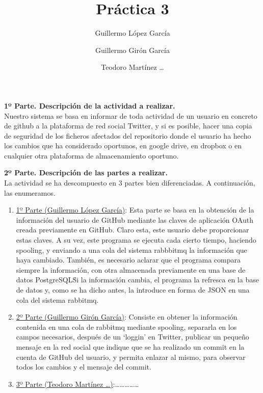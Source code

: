 \documentclass{article}
\title{Práctica 3}
\author{
Guillermo López García
\and
Guillermo Girón García
\and
Teodoro Martínez \ldots
}
\begin{document}
\maketitle
\textbf{1º Parte. Descripción de la actividad a realizar.}\\
Nuestro sistema se basa en informar de toda actividad de un usuario
en concreto de github a la plataforma de red social Twitter, y si es
posible, hacer una copia de seguridad de los ficheros afectados
del repositorio donde el usuario ha hecho los cambios que ha considerado
oportunos, en google drive, en dropbox o en cualquier otra plataforma
de almacenamiento oportuno.

\textbf{2º Parte. Descripción de las partes a realizar.}\\
La actividad se ha descompuesto en 3 partes bien diferenciadas.
A continuación, las enumeramos.
\begin{enumerate}
    \item \underline{1º Parte (Guillermo López García)}: Esta parte se
        basa en la obtención de la información del usuario de GitHub mediante
        las claves de aplicación OAuth creada previamente en GitHub.
        Claro esta, este usuario debe proporcionar estas claves.
        A su vez, este programa se ejecuta cada cierto tiempo, haciendo spooling,
        y enviando a una cola del sistema rabbbitmq la información que haya cambiado.
        También, es necesario aclarar que el programa compara siempre la información,
        con otra almacenada previamente en una base de datos PostgreSQL\. Si la
        información cambia, el programa la refresca en la base de datos y, como se
        ha dicho antes, la introduce en forma de JSON en una cola del sistema
        rabbitmq.
    \item \underline{2º Parte (Guillermo Girón García)}: Consiste en obtener la información
        contenida en una cola de rabbitmq mediante spooling, separarla en los campos
        necesarios, después de un `loggin' en Twitter, publicar un pequeño mensaje en 
        la red social que indique que se ha realizado un commit en la cuenta de GitHub del
        usuario, y permita enlazar al mismo, para observar todos los cambios y el mensaje del
        commit. 
    \item \underline{3º Parte (Teodoro Martínez \ldots)}:\ldots\ldots\ldots\ldots\ldots
\end{enumerate}
\end{document}
